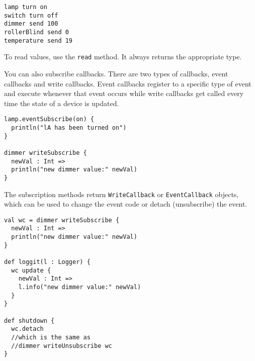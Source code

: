 \begin{lstlisting}
lamp turn on
switch turn off
dimmer send 100
rollerBlind send 0
temperature send 19
\end{lstlisting}

To read values, use the \lstinline!read! method. It always returns the appropriate type.

You can also subscribe callbacks. There are two types of callbacks, event callbacks and write callbacks. Event callbacks register to a specific type of event and execute whenever that event occurs while write callbacks get called every time the state of a device is updated.

\begin{lstlisting}
lamp.eventSubscribe(on) {
  println("lA has been turned on")
}

dimmer writeSubscribe {
  newVal : Int =>
  println("new dimmer value:" newVal)
}
\end{lstlisting}

The subscription methods return \lstinline!WriteCallback! or \lstinline!EventCallback! objects, which can be used to change the event code or detach (unsubscribe) the event.

\begin{lstlisting}
val wc = dimmer writeSubscribe {
  newVal : Int =>
  println("new dimmer value:" newVal)
}

def loggit(l : Logger) {
  wc update {
    newVal : Int =>
    l.info("new dimmer value:" newVal)
  }
}

def shutdown {
  wc.detach
  //which is the same as
  //dimmer writeUnsubscribe wc
}
\end{lstlisting}
